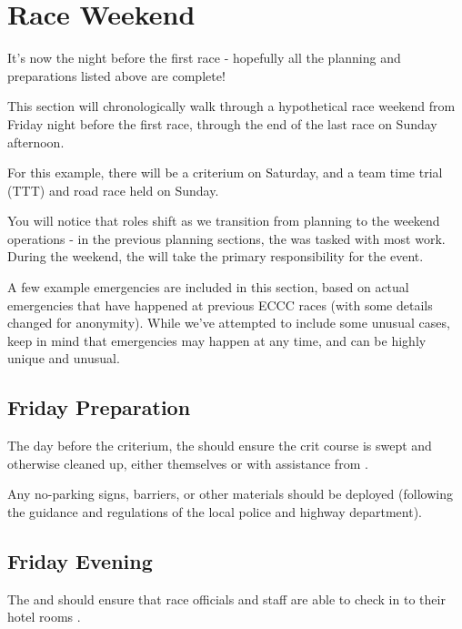 \section{Race Weekend}

It's now the night before the first race - hopefully all the planning and preparations listed above are complete!

This section will chronologically walk through a hypothetical race weekend from Friday night before the first race,
through the end of the last race on Sunday afternoon.

For this example, there will be a criterium on Saturday,
and a team time trial (TTT) %
and road race held on Sunday.

You will notice that roles shift as we transition from planning to the weekend operations -
in the previous planning sections, the  was tasked with most work.
During the weekend, the  will take the primary responsibility for the event.

A few example emergencies are included in this section, based on actual emergencies that have happened at previous ECCC races
(with some details changed for anonymity).
While we've attempted to include some unusual cases, keep in mind that emergencies may happen at any time, and can be highly unique and unusual.

\subsection{Friday Preparation}

The day before the criterium, the  should ensure the crit course is swept and otherwise cleaned up,
either themselves or with assistance from .

Any no-parking signs, barriers, or other materials should be deployed (following the guidance and regulations of the local police and highway department).

\subsection{Friday Evening}

The  and  should ensure that race officials and staff are able to check in to their hotel rooms%
%
.


